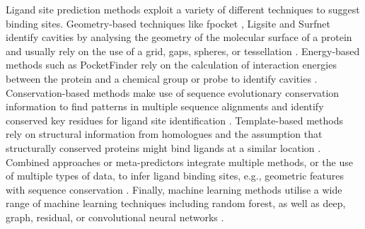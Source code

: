 Ligand site prediction methods exploit a variety of different techniques to suggest binding sites. Geometry-based techniques like fpocket \cite{GUILLOUX_2009_FPOCKET}, Ligsite \cite{HENDLICH_1997_LIGSITE} and Surfnet \cite{LASKOWSKI_1995_SURFNET} identify cavities by analysing the geometry of the molecular surface of a protein and usually rely on the use of a grid, gaps, spheres, or tessellation \cite{GUILLOUX_2009_FPOCKET, SCHMIDTKE_2010_FPOCKET2, WEISEL_2007_POCKETPICKER, BRADY_2000_PASS, LIANG_1998_CAVITIES, HENDLICH_1997_LIGSITE, LASKOWSKI_1995_SURFNET, KLEYWEGT_1994_CAVITIES, LEVITT_1992_POCKET}. Energy-based methods such as PocketFinder \cite{AN_2005_POCKETFINDER} rely on the calculation of interaction energies between the protein and a chemical group or probe to identify cavities \cite{AN_2005_POCKETFINDER, NGAN_2012_FTSITE, GHERSI_2009_SITEHOUND, LAURIE_2005_QSITEFINDER, AN_2004_PREDICTOR, GOODFORD_1982_PREDICTOR}. Conservation-based methods make use of sequence evolutionary conservation information to find patterns in multiple sequence alignments and identify conserved key residues for ligand site identification \cite{XIE_2012_CONSPRED, PUPKO_2002_RATE4SITE, ARMON_2001_SCORE}. Template-based methods rely on structural information from homologues and the assumption that structurally conserved proteins might bind ligands at a similar location \cite{ZVELEBIL_1987_PREDICTION, WASS_2010_3DLIGANDSITE, YANG_2013_COFACTOR, LEE_2013_PREDICTION, BRYLINSKI_2013_EFINDSITE, ROY_2012_COFACTOR}. Combined approaches or meta-predictors integrate multiple methods, or the use of multiple types of data, to infer ligand binding sites, e.g., geometric features with sequence conservation \cite{GUTTERIDGE_2003_LBSP, HUANG_2006_BU48, GLASER_2006_PREDICTION, HALGREN_2009_PREDICITON, CAPRA_2009_CONCAVITY, HUANG_2009_METAPOCKET, BRAY_2009_SITESIDENTIFY, BRYLINSKI_2009_FINDSITE}. Finally, machine learning methods utilise a wide range of machine learning techniques including random forest, as well as deep, graph, residual, or convolutional neural networks \cite{KRIVAK_2015_PRANK, KRIVAK_2015_P2RANK, JIMENEZ_2017_DEEPSITE, KRIVAK_2018_P2RANK, JENDELE_2019_PRANKWEB, SANTANA_2020_GRaSP, KOZLOVSKII_2020_BITENET, STEPNIEWSKA_2020_KALASANTY, KANDEL_2021_PURESNET, MYOLNAS_2021_DEEPSURF, YAN_2022_POINTSITE, LI_2022_RECURPOCKET, AGGARWAL_2022_DEEPPOCKET, JAKUBEC_2022_PRANKWEB, ABDOLLAHI_2023_NODECODER, EVTEEV_2023_SITERADAR, LI_2023_GLPOCKET, ZHANG_2024_EQUIPOCKET, LIU_2023_REFINEPOCKET, SMITH_2024_GrASP, CARBERY_2024_IFSP, SESTAK_2024_VNEGNN, KANDEL_2024_PURESNET}.

